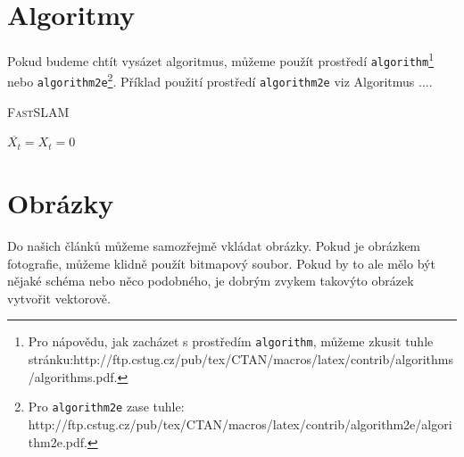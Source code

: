 \documentclass[11pt,a4paper]{article}
\begin{document}
	\section{Algoritmy} \label{algoritmy}
	Pokud budeme chtít vysázet algoritmus, můžeme použít prostředí \texttt{algorithm}\footnote{Pro nápovědu, jak zacházet s prostředím \texttt{algorithm}, můžeme zkusit tuhle stránku:\newline http://ftp.cstug.cz/pub/tex/CTAN/macros/latex/contrib/algorithms/algorithms.pdf.} nebo \texttt{algorithm2e}\footnote{Pro \texttt{algorithm2e} zase tuhle: http://ftp.cstug.cz/pub/tex/CTAN/macros/latex/contrib/algorithm2e/algorithm2e.pdf.}. Příklad použití prostředí \texttt{algorithm2e} viz Algoritmus .... \\[1em]
	
	\IncMargin{1.5em}
	{\SetAlgoNoLine
	\begin{algorithm}[H]
		\caption{\textsc{FastSLAM}}
		\SetNlSty{}{}{:}
				
		\Indm
		\BlankLine
		\Indp
		
		$\overline{X_t} = X_t = 0$ \\
	
	\end{algorithm}
	}
	\DecMargin{1.5em}
	\vspace{1em}
	
	\section{Obrázky}
	Do našich článků můžeme samozřejmě vkládat obrázky. Pokud je obrázkem fotografie,
	můžeme klidně použít bitmapový soubor. Pokud by to ale mělo být nějaké schéma nebo něco podobného, je dobrým zvykem takovýto obrázek vytvořit vektorově.
	
\end{document}
